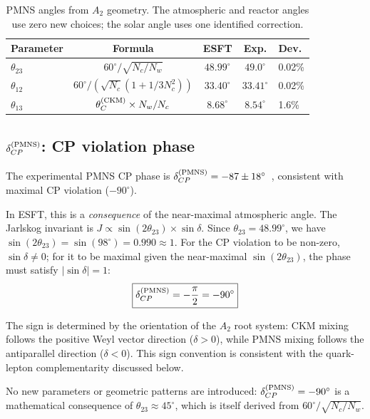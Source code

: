 ﻿\documentclass[prd,twocolumn,showpacs,superscriptaddress,groupedaddress]{revtex4-2}
\begin{document}
\begin{table}[h]
\caption{PMNS angles from $A_2$ geometry. The atmospheric and reactor angles use zero new choices; the solar angle uses one identified correction.}
\label{tab:pmns}
\begin{ruledtabular}
\begin{tabular}{lcccl}
Parameter & Formula & ESFT & Exp. & Dev. \\
\hline
$\theta_{23}$ & $60^\circ/\sqrt{N_c/N_w}$ & $48.99^\circ$ & $49.0^\circ$ & 0.02\% \\
$\theta_{12}$ & $60^\circ/(\sqrt{N_c}(1{+}1/3N_c^2))$ & $33.40^\circ$ & $33.41^\circ$ & 0.02\% \\
$\theta_{13}$ & $\theta_C^{(\rm CKM)} \times N_w/N_c$ & $8.68^\circ$ & $8.54^\circ$ & 1.6\% \\
\end{tabular}
\end{ruledtabular}
\end{table}

\subsection{$\delta_{CP}^{(\rm PMNS)}$: CP violation phase}

The experimental PMNS CP phase is $\delta_{CP}^{(\rm PMNS)} = -87 \pm 18^\circ$~\cite{PDG2024}, consistent with maximal CP violation ($-90^\circ$).

In ESFT, this is a \emph{consequence} of the near-maximal atmospheric angle. The Jarlskog invariant is $J \propto \sin(2\theta_{23}) \times \sin\delta$. Since $\theta_{23} = 48.99^\circ$, we have $\sin(2\theta_{23}) = \sin(98^\circ) = 0.990 \approx 1$. For the CP violation to be non-zero, $\sin\delta \neq 0$; for it to be maximal given the near-maximal $\sin(2\theta_{23})$, the phase must satisfy $|\sin\delta| = 1$:
\begin{equation}
\boxed{\delta_{CP}^{(\rm PMNS)} = -\frac{\pi}{2} = -90^\circ}
\end{equation}

The sign is determined by the orientation of the $A_2$ root system: CKM mixing follows the positive Weyl vector direction ($\delta > 0$), while PMNS mixing follows the antiparallel direction ($\delta < 0$). This sign convention is consistent with the quark-lepton complementarity discussed below.

No new parameters or geometric patterns are introduced: $\delta_{CP}^{(\rm PMNS)} = -90^\circ$ is a mathematical consequence of $\theta_{23} \approx 45^\circ$, which is itself derived from $60^\circ/\sqrt{N_c/N_w}$.
\end{document}

